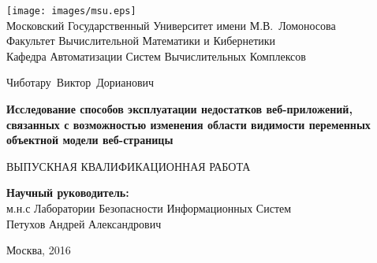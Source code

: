 \thispagestyle{empty}


\begin{center}

\texttt{[image: images/msu.eps]}\\
{Московский Государственный Университет имени М.В.~Ломоносова}\\
Факультет Вычислительной Математики и Кибернетики\\
Кафедра Автоматизации Систем Вычислительных Комплексов

\vspace{5cm}

{\Large Чиботару~Виктор~Дорианович}

\vspace{1cm}

{\Large\bfseries
Исследование способов эксплуатации недостатков веб-приложений, связанных с возможностью изменения области видимости переменных объектной модели веб-страницы\\}

\vspace{1cm}

{\large ВЫПУСКНАЯ КВАЛИФИКАЦИОННАЯ РАБОТА}
\end{center}

\vfill

\begin{flushright}
  \textbf{Научный руководитель:}\\
  м.н.с Лаборатории Безопасности Информационных Систем\\
  Петухов Андрей Александрович
\end{flushright}

\vfill

\begin{center}
Москва, 2016
\end{center}

\newpage